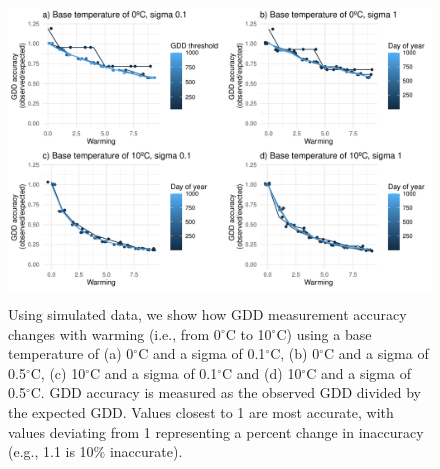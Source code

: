 \documentclass{article}\usepackage[]{graphicx}\usepackage[]{color}
\begin{document}
\begin{figure}[H]
    \centering
    \includegraphics[height=8cm, width=12cm]{..//analyses/figures/gddratio_warming.pdf}
\caption{Using simulated data, we show how GDD measurement accuracy changes with warming (i.e., from 0$^{\circ}$C to 10$^{\circ}$C) using a base temperature of (a) 0$^{\circ}$C and a sigma of 0.1$^{\circ}$C, (b) 0$^{\circ}$C and a sigma of 0.5$^{\circ}$C, (c) 10$^{\circ}$C and a sigma of 0.1$^{\circ}$C and (d) 10$^{\circ}$C and a sigma of 0.5$^{\circ}$C. GDD accuracy is measured as the observed GDD divided by the expected GDD. Values closest to 1 are most accurate, with values deviating from 1 representing a percent change in inaccuracy (e.g., 1.1 is 10\% inaccurate). }
\label{fig:warming}
\end{figure}
  
  
\end{document}
